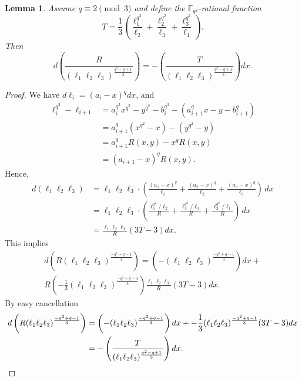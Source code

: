 \documentclass[11pt]{amsart}
\theoremstyle{plain}
\newtheorem{lemma}[theorem]{Lemma}
\theoremstyle{definition}
\theoremstyle{remark}
\newcommand{\R}{\mathbb{R}}
\begin{document}
\begin{lemma} \label{lm:dR-dT}
Assume $q\equiv 2 \pmod3$ and define the $\mathbb{F}_{q^2}$-rational function 
\[T=\frac{1}{3}\left(\frac{\ell_1^{q^2}}{\ell_2} + \frac{\ell_2^{q^2}}{\ell_3} + \frac{\ell_3^{q^2}}{\ell_1}\right).\]
Then
\[d\left(\frac{R}{(\ell_1\ell_{2}\ell_{3})^{\frac{q^2-q+1}{3}}}\right) = - \left(\frac{T}{(\ell_1\ell_{2}\ell_{3})^{\frac{q^2-q+1}{3}}}\right) dx.\]
\end{lemma}
\begin{proof}
We have $d\ell_i=(a_i-x)^q dx$, and
\begin{align*}
\ell_i^{q^2}-\ell_{i+1} &= a_i^{q^3}x^{q^2}-y^{q^2}-b_i^{q^3}-(a_{i+1}^{q}x-y-b_{i+1}^{q}) \\
&= a_{i+1}^q(x^{q^2}-x)-(y^{q^2}-y) \\
&= a_{i+1}^q R(x,y) - x^q R(x,y) \\
&= (a_{i+1}-x)^q R(x,y).
\end{align*}
Hence,
\begin{align*}
d(\ell_1\ell_{2}\ell_{3}) & = \ell_1\ell_{2}\ell_{3} \cdot \left( \frac{(a_1-x)^q}{\ell_1} + \frac{(a_2-x)^q}{\ell_2} + \frac{(a_3-x)^q}{\ell_3}\right)\, dx \\
&= \ell_1\ell_{2}\ell_{3} \cdot \left( \frac{\ell_1^{q^2}/\ell_2}{R} + \frac{\ell_2^{q^2}/\ell_3}{R} + \frac{\ell_3^{q^2}/\ell_1}{R}\right)\, dx \\
&= \frac{\ell_1\ell_{2}\ell_{3}}{R}(3T-3)dx.
\end{align*}
This implies
\begin{multline*}
d\left(R(\ell_1\ell_{2}\ell_{3})^{\frac{-q^2+q-1}{3}}\right) =\left( -(\ell_1\ell_{2}\ell_{3})^{\frac{-q^2+q-1}{3}}\right) dx + \\R \left(-\frac{1}{3}(\ell_1\ell_{2}\ell_{3})^{\frac{-q^2+q-4}{3}}\right) \frac{\ell_1\ell_{2}\ell_{3}}{R}(3T-3)dx.
\end{multline*}
By easy cancellation
\begin{align*}
d\left(R(\ell_1\ell_{2}\ell_{3})^{\frac{-q^2+q-1}{3}}\right) &=\left( -(\ell_1\ell_{2}\ell_{3})^{\frac{-q^2+q-1}{3}}\right) dx + -\frac{1}{3}(\ell_1\ell_{2}\ell_{3})^{\frac{-q^2+q-1}{3}} (3T-3)dx\\
&= - \left(\frac{T}{(\ell_1\ell_{2}\ell_{3})^{\frac{q^2-q+1}{3}}}\right) dx. \qedhere
\end{align*}
\end{proof}
\end{document}

